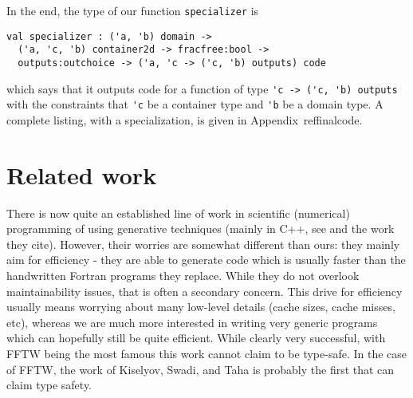 \documentclass[11pt]{elsart}
\begin{document}
In the end, the type of our function \texttt{specializer} is
\begin{small}\begin{verbatim}
val specializer : ('a, 'b) domain ->
  ('a, 'c, 'b) container2d -> fracfree:bool ->
  outputs:outchoice -> ('a, 'c -> ('c, 'b) outputs) code
\end{verbatim}\end{small}
\noindent which says that it outputs code for a 
function of type \verb+'c -> ('c, 'b) outputs+ with the 
constraints that \verb+'c+ be a container type and \verb+'b+ be
a domain type.  A complete listing, with a specialization, is
given in Appendix~ref{finalcode}.

\section{Related work}\label{related}

There is now quite an established line of work in scientific (numerical)
programming of using generative techniques (mainly in C++, see 
\cite{Czarnecki,Veldhuizen:1998:ISCOPE,ATLAS} and the work they cite).
However, their worries are somewhat different than ours: they mainly
aim for efficiency - they are able to generate code which is
usually faster than the handwritten Fortran programs they replace.
While they do not overlook maintainability issues, that is often a 
secondary concern.
This drive for efficiency usually means worrying about many low-level
details (cache sizes, cache misses, etc), whereas we are much more 
interested in writing very generic
programs which can hopefully still be quite efficient.
While clearly very successful, with FFTW \cite{FFTW98} being the most famous 
this work cannot claim to be type-safe.  In the case of FFTW, the work
of Kiselyov, Swadi, and Taha \cite{KiselyovTaha} is probably the first
that can claim type safety.
\end{document}

